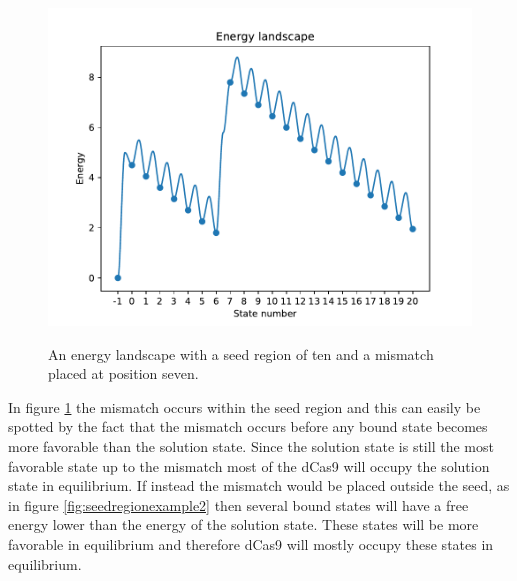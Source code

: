 \begin{figure}[H]
\begin{center}
\includegraphics[width=\textwidth]{images/seedregionexample}
\label{fig:seedregionexample}
\caption{An energy landscape with a seed region of ten and a mismatch placed at position seven.}
\end{center}
\end{figure}

In figure \ref{fig:seedregionexample} the mismatch occurs within the seed region and this can easily be spotted by the fact that the mismatch occurs before any bound state becomes more favorable than the solution state. Since the solution state is still the most favorable state up to the mismatch most of the dCas9 will occupy the solution state in equilibrium. If instead the mismatch would be placed outside the seed, as in figure \ref{fig:seedregionexample2} then several bound states will have a free energy lower than the energy of the solution state. These states will be more favorable in equilibrium and therefore dCas9 will mostly occupy these states in equilibrium.

